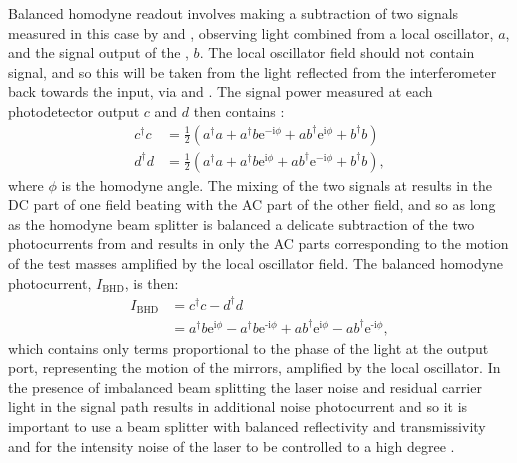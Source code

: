 Balanced homodyne readout involves making a subtraction of two signals measured in this case by \HDA{} and \HDB{}, observing light combined from a local oscillator, $a$, and the signal output of the \SSM{}, $b$. The local oscillator field should not contain signal, and so this will be taken from the light reflected from the interferometer back towards the input, via \MTWELVE{} and \MTHIRTEEN{}. The signal power measured at each photodetector output $c$ and $d$ then contains \cite{Steinlechner2015}:
\begin{equation}
  \begin{split}
    c^{\dag} c &= \frac{1}{2} \left( a^{\dag} a + a^{\dag} b \text{e}^{-\text{i} \phi} + a b^{\dag} \text{e}^{\text{i} \phi} + b^{\dag} b \right) \\
    d^{\dag} d &= \frac{1}{2} \left( a^{\dag} a + a^{\dag} b \text{e}^{\text{i} \phi} + a b^{\dag} \text{e}^{-\text{i} \phi} + b^{\dag} b \right),
  \end{split}
\end{equation}
where $\phi$ is the homodyne angle. The mixing of the two signals at \MSIXTEEN{} results in the \gls{DC} part of one field beating with the \gls{AC} part of the other field, and so as long as the homodyne beam splitter is balanced a delicate subtraction of the two photocurrents from \HDA{} and \HDB{} results in only the \gls{AC} parts corresponding to the motion of the test masses amplified by the local oscillator field. The balanced homodyne photocurrent, $I_{\text{BHD}}$, is then:
\begin{equation}
  \begin{split}
    I_{\text{BHD}} &= c^{\dag} c - d^{\dag} d \\
                   &= a^{\dag} b \text{e}^{\text{i} \phi} - a^{\dag} b \text{e}^{\text{-i} \phi} + a b^{\dag} \text{e}^{\text{i} \phi} - a b^{\dag} \text{e}^{\text{-i} \phi},
  \end{split}
\end{equation}
which contains only terms proportional to the phase of the light at the output port, representing the motion of the mirrors, amplified by the local oscillator. In the presence of imbalanced beam splitting the laser noise and residual carrier light in the signal path results in additional noise photocurrent and so it is important to use a beam splitter with balanced reflectivity and transmissivity and for the intensity noise of the laser to be controlled to a high degree \cite{Steinlechner2015}.

